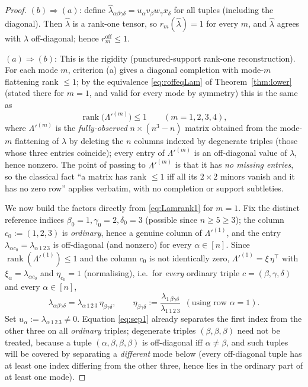 \begin{proof}
$(b)\Rightarrow(a)$: define $\widehat\lambda_{\alpha\beta\gamma\delta}
=u_\alpha v_\beta w_\gamma x_\delta$ for all tuples (including the diagonal). Then
$\widehat\lambda$ is a rank-one tensor, so $r_m(\widehat\lambda)=1$ for every $m$, and
$\widehat\lambda$ agrees with $\lambda$ off-diagonal; hence $r_m^{\mathrm{off}}\le1$.

$(a)\Rightarrow(b)$: This is the rigidity (punctured-support rank-one
reconstruction). For each mode $m$, criterion (a) gives a diagonal completion with mode-$m$
flattening rank $\le1$; by the equivalence \eqref{eq:roffeqLam} of Theorem~\ref{thm:lower}
(stated there for $m=1$, and valid for every mode by symmetry) this is the same as
\begin{equation}\label{eq:Lamrank1}
\operatorname{rank}\big(\Lambda'^{(m)}\big)\le1\qquad(m=1,2,3,4),
\end{equation}
where $\Lambda'^{(m)}$ is the \emph{fully-observed} $n\times(n^3-n)$ matrix obtained from the
mode-$m$ flattening of $\lambda$ by deleting the $n$ columns indexed by degenerate triples
(those whose three entries coincide); every entry of $\Lambda'^{(m)}$ is an off-diagonal
value of $\lambda$, hence nonzero. The point of passing to $\Lambda'^{(m)}$ is that it has
\emph{no missing entries}, so the classical fact ``a matrix has rank $\le1$ iff all its
$2\times2$ minors vanish and it has no zero row'' applies verbatim, with no completion or
support subtleties.

We now build the factors directly from \eqref{eq:Lamrank1} for $m=1$. Fix the distinct
reference indices $\beta_0=1,\gamma_0=2,\delta_0=3$ (possible since $n\ge5\ge3$); the column
$c_0:=(1,2,3)$ is \emph{ordinary}, hence a genuine column of $\Lambda'^{(1)}$, and the entry
$\lambda_{\alpha c_0}=\lambda_{\alpha\,1\,2\,3}$ is off-diagonal (and nonzero) for every
$\alpha\in[n]$. Since $\operatorname{rank}(\Lambda'^{(1)})\le1$ and the column $c_0$ is not
identically zero, $\Lambda'^{(1)}=\xi\,\eta^{\!\top}$ with $\xi_\alpha=\lambda_{\alpha c_0}$
and $\eta_{c_0}=1$ (normalising), i.e.\ for \emph{every} ordinary triple
$c=(\beta,\gamma,\delta)$ and every $\alpha\in[n]$,
\begin{equation}\label{eq:sep1}
\lambda_{\alpha\beta\gamma\delta}=\lambda_{\alpha\,1\,2\,3}\,\eta_{\beta\gamma\delta},
\qquad \eta_{\beta\gamma\delta}:=\frac{\lambda_{1\,\beta\gamma\delta}}{\lambda_{1\,1\,2\,3}}
\ \ (\text{using row }\alpha=1).
\end{equation}
Set $u_\alpha:=\lambda_{\alpha\,1\,2\,3}\ne0$. Equation \eqref{eq:sep1} already separates the
first index from the other three on all \emph{ordinary} triples; degenerate triples
$(\beta,\beta,\beta)$ need not be treated, because a tuple
$(\alpha,\beta,\beta,\beta)$ is off-diagonal iff $\alpha\ne\beta$, and such tuples will be
covered by separating a \emph{different} mode below (every off-diagonal tuple has at least one
index differing from the other three, hence lies in the ordinary part of at least one mode).


\end{proof}
